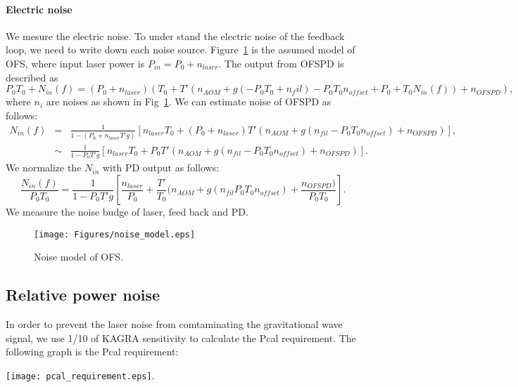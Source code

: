 			\begin{center}
			\end{center}
\paragraph{Electric noise}
We mesure the electric noise. To under stand the electric noise of the feedback loop, we need to write down each noise source.
Figure~\ref{fig:noise} is the assumed model of OFS, where input laser power is $P_{in}=P_0 + n_{laser}$.
The output from OFSPD is described as
\begin{equation}
P_0 T_0 +N_{in}(f) = (P_0 +n_{laser})(T_0+T'(n_{AOM}+g(-P_0 T_0+n_fil)-P_0 T_0 n_{offset} +P_0 +T_0 N_{in}(f))+n_{OFSPD}),
\end{equation}
where $n_{i}$ are noises as shown in Fig~\ref{fig:noise}. We can estimate noise of OFSPD as follows:
\begin{eqnarray}
N_{in}(f)&=&\frac{1}{1-(P_0+n_{laser}T'g)}[n_{laser}T_0 + (P_0+n_{laser})T'(n_{AOM}+g(n_{fil}-P_0T_0n_{offset})+n_{OFSPD})], \nonumber \\
&\sim&\frac{1}{1-P_0T'g}[n_{laser}T_0 + P_0T'(n_{AOM}+g(n_{fil}-P_0T_0n_{offset})+n_{OFSPD})].
\end{eqnarray}
We normalize the $N_{in}$ with PD output as follows:
\begin{equation}
\frac{N_{in}(f)}{P_0T_0}=\frac{1}{1-P_0T'g}[\frac{n_{laser}}{P_0} + \frac{T'}{T_0}(n_{AOM}+g(n_{fil}P_0T_0n_{offset})+\frac{n_{OFSPD})}{P_0T_0}].
\end{equation}
 We measure the noise budge of laser, feed back and PD.
\begin{figure}
\begin{center}
\texttt{[image: Figures/noise\_model.eps]}
\caption{Noise model of OFS.} 
\label{fig:noise} 
\end{center}
\end{figure}


\subsection{Relative power noise}
In order to prevent the laser noise from comtaminating the gravitational wave signal, we use 1/10 of KAGRA sensitivity to calculate the Pcal requirement. The following graph is the Pcal requirement:
\begin{center}
	\texttt{[image: pcal\_requirement.eps]}.
\end{center}

